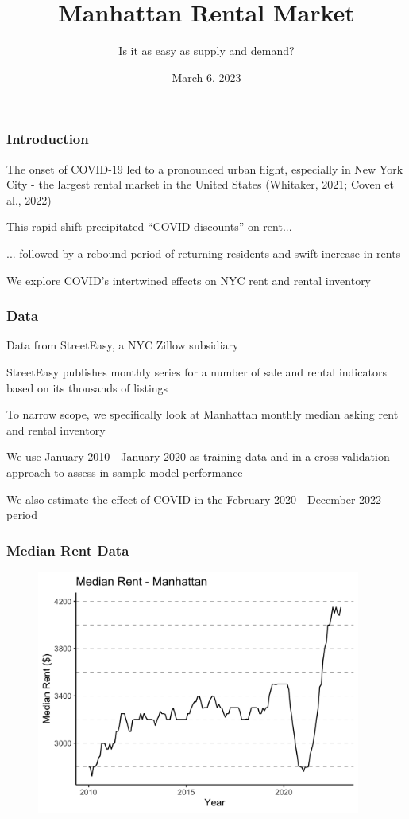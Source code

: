 \documentclass[t]{beamer}
\title{Manhattan Rental Market}
\subtitle{Is it as easy as supply and demand?}
\author[W.\,Janson \& D.\,Keller \& S.\,Olalla \& M.\,Wagner]
{%
  \texorpdfstring{
    \begin{columns}%
      \column{.45\linewidth}
      \footnotesize
      \centering
      Wesley Janson\\
      \href{mailto:wrjanson@uchicago.edu}{\texttt{wrjanson@uchicago.edu}}\\
      \vspace*{0.35cm}\\
      Sergio Olalla\\
      \href{mailto:sergiou@uchicago.edu}{\texttt{sergiou@uchicago.edu}}
      \column{.45\linewidth}
      \footnotesize
      \centering
      Drew Keller\\
      \href{mailto:drewkeller@uchicago.edu}{\texttt{drewkeller@uchicago.edu}}\\
      \vspace*{0.35cm}\\
      Michael Wagner\\
      \href{mailto:wagnerm@uchicago.edu}{\texttt{wagnerm@uchicago.edu}}
    \end{columns}
  }
  {Wesley Janson \& Drew Keller \& Sergio Olalla \& Michael Wagner}
}
\institute{\normalsize University of Chicago - MSCA 31006}
\date{March 6, 2023}
\let\tempone\itemize
\let\temptwo\enditemize
\renewenvironment{itemize}{\tempone\addtolength{\itemsep}{0.5\baselineskip}}{\temptwo}
\begin{document}
\frame{\titlepage}

\begin{frame}
\frametitle{Introduction}
\begin{itemize}
\item The onset of COVID-19 led to a pronounced urban flight, especially in New York City - the largest rental market in the United States (Whitaker, 2021; Coven et al., 2022)
\item This rapid shift precipitated ``COVID discounts'' on rent...
\item ... followed by a rebound period of returning residents and swift increase in rents
\item We explore COVID's intertwined effects on NYC rent and rental inventory

\end{itemize}
\end{frame}

\begin{frame}
\frametitle{Data}
\begin{itemize}
\item Data from StreetEasy, a NYC Zillow subsidiary
\item StreetEasy publishes monthly series for a number of sale and rental indicators based on its thousands of listings
\item To narrow scope, we specifically look at Manhattan monthly median asking rent and rental inventory
\item We use January 2010 - January 2020 as training data and in a cross-validation approach to assess in-sample model performance
\item We also estimate the effect of COVID in the February 2020 - December 2022 period %

\end{itemize}
\end{frame}

\begin{frame}
\frametitle{Median Rent Data}
\begin{figure}
\includegraphics[width=4.2in]{rent_raw_series.png}
\end{figure}
\end{frame}
\end{document}

